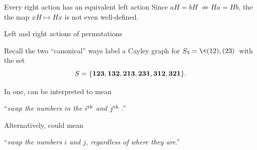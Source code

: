 \documentclass[8pt, handout]{beamer}
\newcommand{\Pause}{}      %
\begin{document}
\begin{frame}[fragile]{Every right action has an equivalent left action}
  Since $aH=bH\;\not\Rightarrow Ha=Hb$, the the map $xH\mapsto Hx$ is
  not even well-defined.
  
\end{frame}


\begin{frame}{Left and right actions of permutations}
  
  Recall the two ``canonical'' ways 
  label a Cayley graph for $S_3=\<(12),(23)\>$ with
  the set
  \[
  S=\{\bf 123,132,213,231,312,321\}. 
  \]
  
  \Pause
  
  In one,  can be interpreted to mean
  \begin{center}
    ``\emph{swap the numbers in the $i^{\rm th}$ and $j^{\rm th}$
      }.''
  \end{center}
  \Pause Alternatively,  could mean
  \begin{center}
    ``\emph{swap the {\color{xPurple}numbers} $i$ and $j$, regardless
      of where they are}.''
  \end{center}
  
  \vspace{-6mm}\Pause
  

\end{frame}
\end{document}
